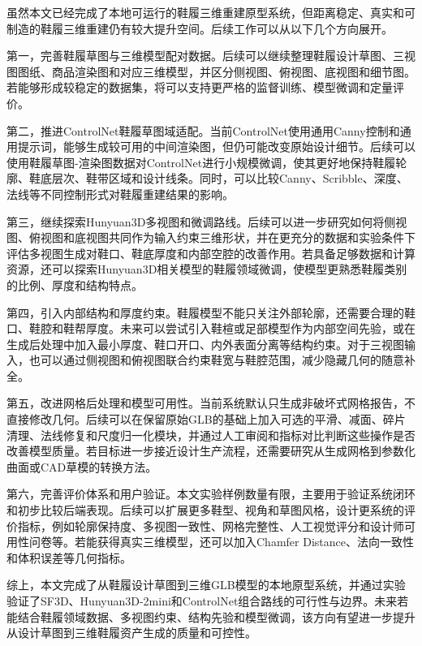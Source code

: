 虽然本文已经完成了本地可运行的鞋履三维重建原型系统，但距离稳定、真实和可制造的鞋履三维重建仍有较大提升空间。后续工作可以从以下几个方向展开。

第一，完善鞋履草图与三维模型配对数据。后续可以继续整理鞋履设计草图、三视图图纸、商品渲染图和对应三维模型，并区分侧视图、俯视图、底视图和细节图。若能够形成较稳定的数据集，将可以支持更严格的监督训练、模型微调和定量评价。

第二，推进ControlNet鞋履草图域适配。当前ControlNet使用通用Canny控制和通用提示词，能够生成较可用的中间渲染图，但仍可能改变原始设计细节。后续可以使用鞋履草图-渲染图数据对ControlNet进行小规模微调，使其更好地保持鞋履轮廓、鞋底层次、鞋带区域和设计线条。同时，可以比较Canny、Scribble、深度、法线等不同控制形式对鞋履重建结果的影响。

第三，继续探索Hunyuan3D多视图和微调路线。后续可以进一步研究如何将侧视图、俯视图和底视图共同作为输入约束三维形状，并在更充分的数据和实验条件下评估多视图生成对鞋口、鞋底厚度和内部空腔的改善作用。若具备足够数据和计算资源，还可以探索Hunyuan3D相关模型的鞋履领域微调，使模型更熟悉鞋履类别的比例、厚度和结构特点。

第四，引入内部结构和厚度约束。鞋履模型不能只关注外部轮廓，还需要合理的鞋口、鞋腔和鞋帮厚度。未来可以尝试引入鞋楦或足部模型作为内部空间先验，或在生成后处理中加入最小厚度、鞋口开口、内外表面分离等结构约束。对于三视图输入，也可以通过侧视图和俯视图联合约束鞋宽与鞋腔范围，减少隐藏几何的随意补全。

第五，改进网格后处理和模型可用性。当前系统默认只生成非破坏式网格报告，不直接修改几何。后续可以在保留原始GLB的基础上加入可选的平滑、减面、碎片清理、法线修复和尺度归一化模块，并通过人工审阅和指标对比判断这些操作是否改善模型质量。若目标进一步接近设计生产流程，还需要研究从生成网格到参数化曲面或CAD草模的转换方法。

第六，完善评价体系和用户验证。本文实验样例数量有限，主要用于验证系统闭环和初步比较后端表现。后续可以扩展更多鞋型、视角和草图风格，设计更系统的评价指标，例如轮廓保持度、多视图一致性、网格完整性、人工视觉评分和设计师可用性问卷等。若能获得真实三维模型，还可以加入Chamfer Distance、法向一致性和体积误差等几何指标。

综上，本文完成了从鞋履设计草图到三维GLB模型的本地原型系统，并通过实验验证了SF3D、Hunyuan3D-2mini和ControlNet组合路线的可行性与边界。未来若能结合鞋履领域数据、多视图约束、结构先验和模型微调，该方向有望进一步提升从设计草图到三维鞋履资产生成的质量和可控性。
